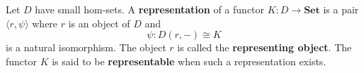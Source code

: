 Let $D$ have small hom-sets. A \textbf{representation} of a functor $K: D \to \mathbf{Set}$ is a pair $\langle r, \psi \rangle$ where $r$ is an object of $D$ and
$$\psi: D(r, -) \cong K$$
is a natural isomorphism. The object $r$ is called the \textbf{representing object}. The functor $K$ is said to be \textbf{representable} when such a representation exists.